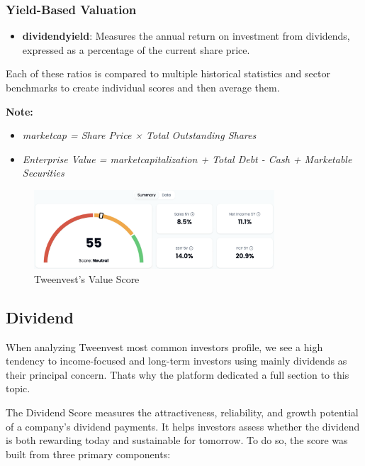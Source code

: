 \documentclass[11pt,english,a4paper,hidelinks]{book}
\begin{document}
\subsubsection{Yield-Based Valuation}
\begin{itemize}
    \item \textbf{\acrshort{dividendyield}}: Measures the annual return on investment from dividends, expressed as a percentage of the current share price.
\end{itemize}

\vspace{0.5cm}
\noindent Each of these ratios is compared to multiple historical statistics and sector benchmarks to create individual scores and then average them.

\vspace{0.5cm}
\noindent \textbf{Note:}
\begin{itemize}
    \item \textit{\acrshort{marketcap} = Share Price × Total Outstanding Shares}
    \item \textit{Enterprise Value = \acrshort{marketcap}italization + Total Debt - Cash + Marketable Securities}
\end{itemize}

\begin{figure}[H]
    \centering
    \includegraphics[width=0.8\textwidth]{images/tweenvest/value score.png}
    \caption{Tweenvest's Value Score}
    \label{fig:valuation_score}
\end{figure}


\subsection{Dividend}
\noindent When analyzing Tweenvest most common investors profile, we see a high tendency to income-focused and long-term investors using mainly dividends as their principal concern. Thats why the platform dedicated a full section to this topic. 

\vspace{0.5cm}
\noindent The Dividend Score measures the attractiveness, reliability, and growth potential of a company's dividend payments. It helps investors assess whether the dividend is both rewarding today and sustainable for tomorrow. To do so, the score was built from three primary components:
\end{document}
